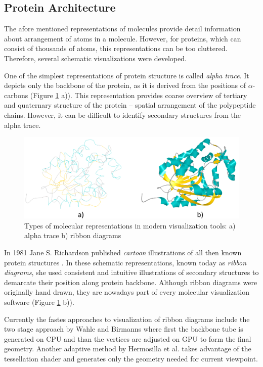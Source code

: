 \subsection{Protein Architecture}
The afore mentioned representations of molecules provide detail information about arrangement of atoms in a molecule. However, for proteins, which can consist of thousands of atoms, this representations can be too cluttered. Therefore, several schematic visualizations were developed.

One of the simplest representations of protein structure is called \textit{alpha trace}. It depicts only the backbone of the protein, as it is derived from the positions of $\alpha$-carbons (Figure \ref{Fig:vis2} a)). This representation provides coarse overview of tertiary and quaternary structure of the protein -- spatial arrangement of the polypeptide chains. However, it can be difficult to identify secondary structures from the alpha trace.

\begin{figure}[H]
  \centering
  \includegraphics[width=\linewidth]{pictures/representations.pdf} 
  \caption{Types of molecular representations in modern visualization tools: a) alpha trace b) ribbon diagrams}
  \label{Fig:vis2}  
\end{figure} 

In 1981 Jane S. Richardson published \textit{cartoon} illustrations of all then known protein structures \cite{richardson1981anatomy}. In these schematic representations, known today as \textit{ribbon diagrams}, she used consistent and intuitive illustrations of secondary structures to demarcate their position along protein backbone. Although ribbon diagrams were originally hand drawn, they are nowadays part of every molecular visualization software (Figure \ref{Fig:vis2} b)).

Currently the fastes approaches to visualization of ribbon diagrams include the two stage approach by Wahle and Birmanns \cite{wahle2011gpu} where first the backbone tube is generated on CPU and than the vertices are adjusted on GPU to form the final geometry. Another adaptive method by Hermosilla et al. \cite{hermosilla2015instant} takes advantage of the tessellation shader and generates only the geometry needed for current viewpoint.

